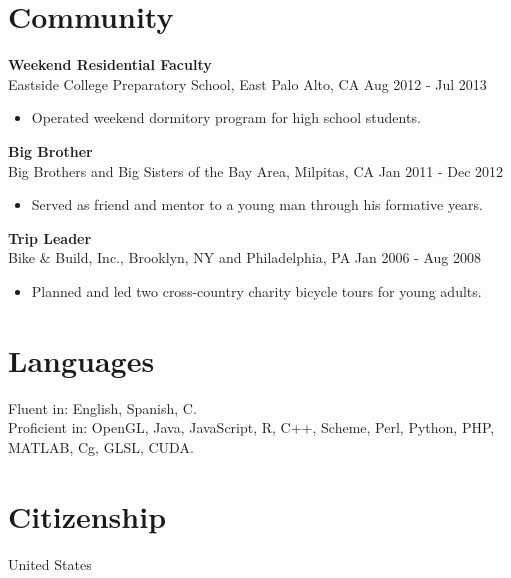 \documentclass[line,margin]{res}
\begin{document}
\begin{resume}
\section{Community}
\textbf{Weekend Residential Faculty} \\
Eastside College Preparatory School, East Palo Alto, CA \hfill Aug 2012 - Jul 2013
\begin{itemize}  \itemsep -2pt %
\item Operated weekend dormitory program for high school students.
\end{itemize}

\textbf{Big Brother} \\
Big Brothers and Big Sisters of the Bay Area, Milpitas, CA \hfill Jan 2011 - Dec 2012
\begin{itemize}  \itemsep -2pt %
\item Served as friend and mentor to a young man through his formative years.
\end{itemize}

\textbf{Trip Leader} \\
Bike \& Build, Inc., Brooklyn, NY and Philadelphia, PA \hfill Jan 2006 - Aug 2008
\begin{itemize}  \itemsep -2pt %
\item Planned and led two cross-country charity bicycle tours for young adults.
\end{itemize}




\section{Languages}
Fluent in: English, Spanish, C.\\
Proficient in: OpenGL, Java, JavaScript, R, C++, Scheme, Perl, Python, PHP,
MATLAB, Cg, GLSL, CUDA.

\section{Citizenship}
United States

\end{resume}
\end{document}
